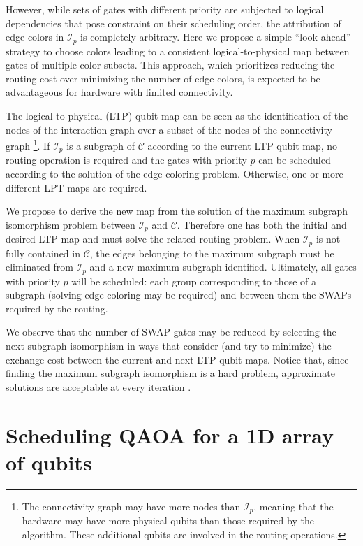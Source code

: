 \documentclass[%
onecolumn,pra,
superscriptaddress,
nofootinbib,
 amsmath,amssymb,
 aps,
11pt,
]{revtex4-1}
\def\note#1{\textbf{\color{red}[#1]}}
\begin{document}
However, while sets of gates with different priority are subjected to logical dependencies that pose constraint on their scheduling order, the attribution of edge colors in $\mathcal{I}_p$ is completely arbitrary. Here we propose a simple ``look ahead'' strategy to choose colors leading to a consistent logical-to-physical map between gates of multiple color subsets. This approach, which prioritizes reducing the routing cost over minimizing the number of edge colors, is expected to be advantageous for hardware with limited connectivity.

The logical-to-physical (LTP) qubit map can be seen as the identification of the nodes of the interaction graph over a subset of the nodes of the connectivity graph%
\footnote{The connectivity graph may have more nodes than $\mathcal{I}_p$, meaning that the hardware may have more physical qubits than those required by the algorithm. These additional qubits are involved in the routing operations.}.
If $\mathcal{I}_p$ is a subgraph of $\mathcal{C}$ according to the current LTP qubit map, no routing operation is required and the gates with priority $p$ can be scheduled according to the solution of the edge-coloring problem. Otherwise, one or more different LPT maps are required.

We propose to derive the new map from the solution of the maximum subgraph isomorphism problem between $\mathcal{I}_p$ and $\mathcal{C}$. Therefore one has both the initial and desired LTP map and must solve the related routing problem. When $\mathcal{I}_p$ is not fully contained in $\mathcal{C}$, the edges belonging to the maximum subgraph must be eliminated from $\mathcal{I}_p$ and a new maximum subgraph identified. Ultimately, all gates with priority $p$ will be scheduled: each group corresponding to those of a subgraph (solving edge-coloring may be required) and between them the SWAPs required by the routing.

We observe that the number of SWAP gates may be reduced by selecting the next subgraph isomorphism in ways that consider (and try to minimize) the exchange cost between the current and next LTP qubit maps.
Notice that, since finding the maximum subgraph isomorphism is a hard problem, approximate solutions are acceptable at every iteration \cite{Bahiense2012}.



\section{Scheduling QAOA for a 1D array of qubits}
\label{sec:QAOA}
\end{document}
